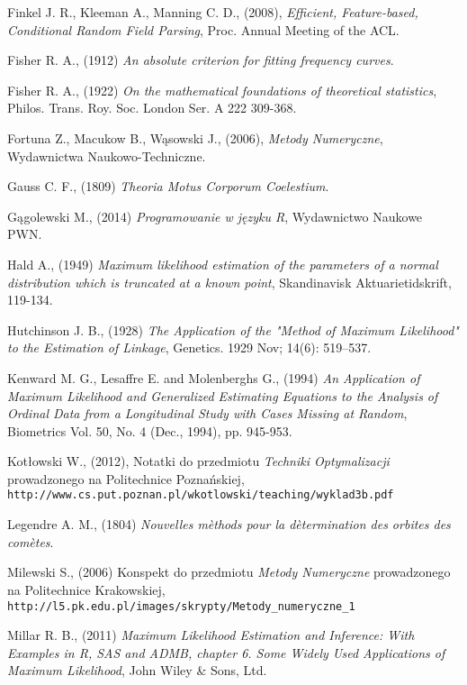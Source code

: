 \begin{thebibliography}{99}
  Finkel J. R., Kleeman A., Manning C. D., (2008), \textit{Efficient, Feature-based, Conditional Random Field Parsing}, Proc. Annual Meeting of the ACL.

 Fisher R. A., (1912) \textit{An absolute criterion for fitting frequency curves}. 

 Fisher R. A., (1922) \textit{On the mathematical foundations of theoretical statistics}, Philos. Trans. Roy. Soc. London Ser. A 222 309-368.

 Fortuna Z., Macukow B., Wąsowski J., (2006), \textit{Metody Numeryczne}, Wydawnictwa Naukowo-Techniczne.

 Gauss C. F., (1809) \textit{Theoria Motus Corporum Coelestium}.

 Gągolewski M., (2014) \textit{Programowanie w języku R}, Wydawnictwo Naukowe PWN.


 Hald A., (1949) \textit{Maximum likelihood estimation of the parameters of a normal distribution which is truncated at a known point}, Skandinavisk Aktuarietidskrift, 119-134.

 Hutchinson J. B., (1928) \textit{The Application of the "Method of Maximum Likelihood" to the Estimation of Linkage}, Genetics. 1929 Nov; 14(6): 519–537.


 Kenward M. G., Lesaffre E. and Molenberghs G., (1994) \textit{An Application of Maximum Likelihood and Generalized Estimating Equations to the Analysis of Ordinal Data from a Longitudinal Study with Cases Missing at Random}, Biometrics
Vol. 50, No. 4 (Dec., 1994), pp. 945-953.

 Kotłowski W., (2012), Notatki do przedmiotu \textit{Techniki Optymalizacji} prowadzonego na Politechnice Poznańskiej, \\ \texttt{http://www.cs.put.poznan.pl/wkotlowski/teaching/wyklad3b.pdf}

 Legendre A. M., (1804) \textit{Nouvelles m\`ethods pour la d\`etermination des orbites des com\`etes}.

 Milewski S., (2006) Konspekt do przedmiotu \textit{Metody Numeryczne} prowadzonego na Politechnice Krakowskiej, \\ \texttt{http://l5.pk.edu.pl/images/skrypty/Metody\_numeryczne\_1}

 Millar R. B., (2011) \textit{Maximum Likelihood Estimation and Inference: With Examples in R, SAS and ADMB, chapter 6. Some Widely Used Applications of Maximum Likelihood}, John Wiley \& Sons, Ltd.


\end{thebibliography}
